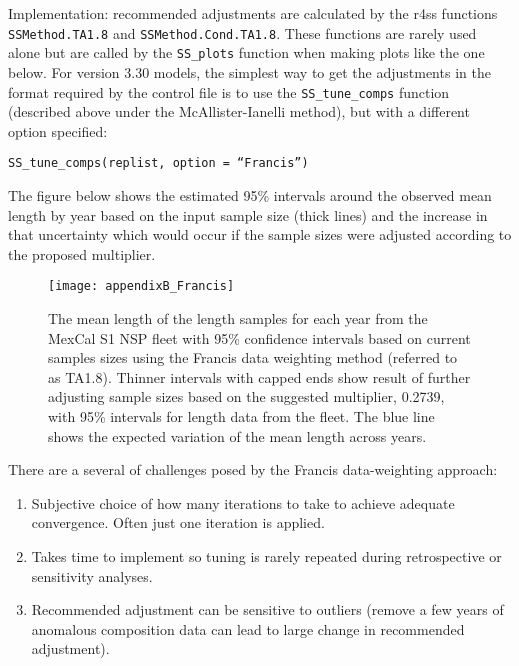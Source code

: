 Implementation: recommended adjustments are calculated by the r4ss functions \texttt{SSMethod.TA1.8} and \texttt{SSMethod.Cond.TA1.8}. These functions are rarely used alone but are called by the \texttt{SS\_plots} function when making plots like the one below. For version 3.30 models, the simplest way to get the adjustments in the format required by the control file is to use the \texttt{SS\_tune\_comps} function (described above under the McAllister-Ianelli method), but with a different option specified: 

\texttt{SS\_tune\_comps(replist, option = ``Francis'')}

The figure below shows the estimated 95\% intervals around the observed mean length by year based on the input sample size (thick lines) and the increase in that uncertainty which would occur if the sample sizes were adjusted according to the proposed multiplier.

\begin{figure}[ht]
	\begin{center}
		\texttt{[image: appendixB\_Francis]}\\
	\end{center}
	\caption{The mean length of the length samples for each year from the MexCal S1 NSP fleet with 95\% confidence intervals based on current samples sizes using the Francis data weighting method (referred to as TA1.8). Thinner intervals with capped ends show result of further adjusting sample sizes based on the suggested multiplier, 0.2739, with 95\% intervals for length data from the fleet. The blue line shows the expected variation of the mean length across years.}
	\label{fig:francis}
\end{figure}

There are a several of challenges posed by the Francis data-weighting approach:
\begin{enumerate}
	\item Subjective choice of how many iterations to take to achieve adequate convergence. Often just one iteration is applied.
	
	\item Takes time to implement so tuning is rarely repeated during retrospective or sensitivity analyses.
	
	\item Recommended adjustment can be sensitive to outliers (remove a few years of anomalous composition data can lead to large change in recommended adjustment).
\end{enumerate}

